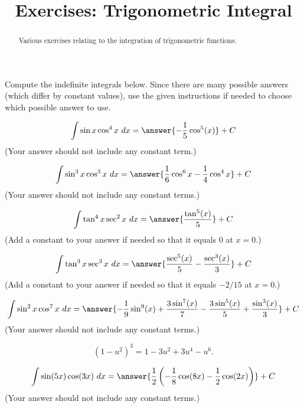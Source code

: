 \documentclass{ximera}
\title{Exercises: Trigonometric Integral}
\begin{document}
\begin{abstract}
Various exercises relating to the integration of trigonometric functions.
\end{abstract}
\maketitle


Compute the indefinite integrals below. Since there are many possible answers (which differ by constant values), use the given instructions if needed to choose which possible answer to use.

\begin{exercise}%
\[  \int \sin x\cos^4x\ dx = \answer{-\frac{1}{5} \cos ^5(x)}+C\]
(Your answer should not include any constant term.)
%
%
\end{exercise}

\begin{exercise}%
\[ \int \sin^3 x\cos^3 x\ dx = \answer{\frac{1}{6}\cos^6x-\frac{1}{4}\cos^4x}+C\]
(Your answer should not include any constant terms.)
%
%
\end{exercise}

\begin{exercise}%
\[ \int \tan^4x\sec^2x\ dx = \answer{\frac{\tan ^5(x)}{5}}+ C\]
(Add a constant to your answer if needed so that it equals $0$ at $x = 0$.)
%
%
\end{exercise}

\begin{exercise}%
\[ \int \tan^3x\sec^3x\ dx = \answer{\frac{\sec ^5(x)}{5}-\frac{\sec ^3(x)}{3}}+ C\]
(Add a constant to your answer if needed so that it equals $-2/15$ at $x = 0$.)
%
%
\end{exercise}

\begin{exercise}%
\[ \int \sin^2 x\cos^7 x\ dx = \answer{-\frac{1}{9} \sin ^{9}(x)+\frac{3 \sin^7(x)}{7}-\frac{3\sin ^5(x)}{5}+\frac{\sin ^3(x)}{3}}+ C\]
(Your answer should not include any constant terms.)
\begin{hint}
\[ (1-u^2)^3 = 1 - 3 u^2 + 3 u^4 - u^6. \]
\end{hint}
%
%
\end{exercise}

\begin{exercise}%
\[ \int \sin(5x)\cos(3x)\ dx = \answer{\frac{1}{2}\left(-\frac{1}{8}\cos(8x)-\frac{1}{2}\cos(2x)\right)}+ C\]
(Your answer should not include any constant terms.)
%
%
\end{exercise}
\end{document}
